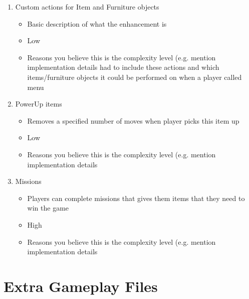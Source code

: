 \documentclass[11pt]{article}
\begin{document}
\begin{enumerate}
\item Custom actions for Item and Furniture objects
	\begin{itemize}
	\item Basic description of what the enhancement is
	\item Low
	\item Reasons you believe this is the complexity level (e.g. mention implementation details
        had to include these actions and which items/furniture objects it could be performed on
        when a player called menu
	\end{itemize}

\item PowerUp items
	\begin{itemize}
	\item Removes a specified number of moves when player picks this item up
	\item Low
	\item Reasons you believe this is the complexity level (e.g. mention implementation details
	\end{itemize}

\item Missions
	\begin{itemize}
	\item Players can complete missions that gives them items that they need to win the game
	\item High
	\item Reasons you believe this is the complexity level (e.g. mention implementation details
	\end{itemize}


\end{enumerate}


\section*{Extra Gameplay Files}
\end{document}

